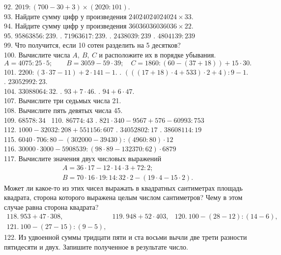 92. $2019:(700-30+3) \times (2020:101).$\\
93. Найдите сумму цифр у произведения $24024024024024\times33.$\\
94. Найдите сумму цифр у произведения $36 036 036 036 036 \times 22.$\\
95. $95863856:239.$ . $71963617:239.$ . $2438039 : 239$ . $4804139 : 239$\\
99. Что получится, если 10 сотен разделить на 5 десятков?\\
100. Вычислите числа $A,\ B,\ C$ и расположите их в порядке убывания.\\
$A=4075:25\cdot5; \qquad B=3059-59\cdot39; \quad C=1860:(60-(37+18))+15\cdot30.$\\
101. $2200:(3\cdot37-11)+2\cdot141-1.$ . $(((17+18)\cdot4+533)\cdot2+4):9-1.$ . $23052992:23.$ \\ 104. $33088064:32.$
. $93+7\cdot46.$ . $94+6\cdot47.$\\
107. Вычислите три седьмых числа 21.\\
108. Вычислите пять девятых числа 45.\\
109. $68578:34$ \ 110. $86774:43$ . $821 \cdot 340 - 9567 + 576 - 60993 : 753$ \\ 112. $1000 - 32032 : 208 + 551156 : 607$ . $34052802 : 17$ . $38608114 : 19$ \\ 115. $6040 \cdot 706 : 80 - (302000 - 39430) : (4960 : 80) \cdot 12$\\
116. $30000\cdot 3000 - 5908539 : (98 \cdot 89 - 132370 : 62) \cdot 6879$\\
117. Вычислите значения двух числовых выражений
$$\begin{array}{l} A=36\cdot17-12\cdot14\cdot3+72:2;\\
B=70\cdot16\cdot19:14:32\cdot2-(19\cdot4-15\cdot2).\end{array}$$
Может ли какое-то из этих чисел выражать в квадратных сантиметрах площадь квадрата, сторона которого выражена целым числом сантиметров? Чему в этом случае равна сторона квадрата?\\
$\begin{array}{lll}
118.\ 953 + 47 \cdot 308,& 119.\ 948 + 52 \cdot 403,& 120.\ 100 - (28 - 12) : (14 - 6),\\
121.\ 100 - (27 - 15) : (9 - 5),
\end{array}$\\
122. Из удвоенной суммы тридцати пяти и ста восьми вычли две трети разности пятидесяти и двух. Запишите полученное в результате число.\\
